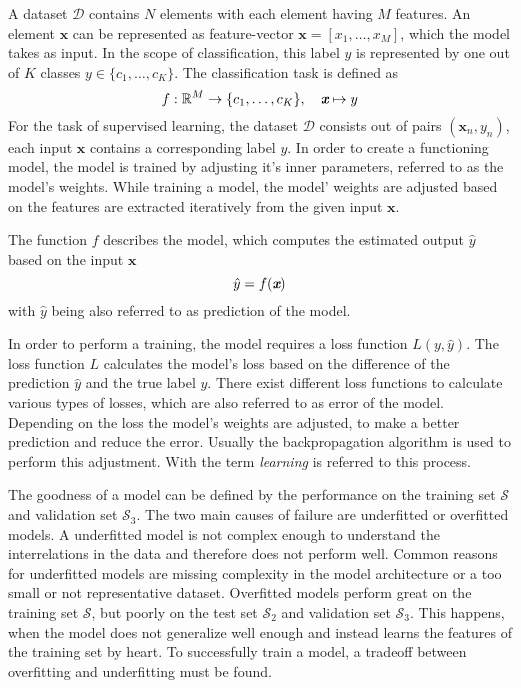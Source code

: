 A dataset $\mathcal{D}$ contains $N$ elements with each element having $M$ features.
An element $\textbf{x}$ can be represented as feature-vector $\textbf{x} = [x_1, \dots ,x_M]$, which the model takes as input.
In the scope of classification, this label $y$ is represented by one out of $K$ classes $y \in \lbrace c_1, \dots, c_K \rbrace$.
The classification task is defined as  
\begin{equation}
	f: \mathbb{R}^M \rightarrow \lbrace c_1,\ldots,c_K \rbrace, \quad \textit{\textbf{x}} \mapsto y
\end{equation}
For the task of supervised learning, the dataset $\mathcal{D}$ consists out of pairs $(\textbf{x}_n, y_n)$, each input $\textbf{x}$ contains a corresponding label $y$.
In order to create a functioning model, the model is trained by adjusting it's inner parameters, referred to as the model's weights.
While training a model, the model' weights are adjusted based on the features are extracted iteratively from the given input $\textbf{x}$.

The function $f$ describes the model, which computes the estimated output $\hat{y}$ based on the input $\textbf{x}$
\begin{equation}
	\hat y = f(\textit{\textbf{x}})
\end{equation}
with $\hat{y}$ being also referred to as prediction of the model.

In order to perform a training, the model requires a loss function $L(y,\hat{y})$.
The loss function $L$ calculates the model's loss based on the difference of the prediction $\hat{y}$ and the true label $y$.
There exist different loss functions to calculate various types of losses, which are also referred to as error of the model.
Depending on the loss the model's weights are adjusted, to make a better prediction and reduce the error.
Usually the backpropagation algorithm is used to perform this adjustment.
With the term \textit{learning} is referred to this process.

The goodness of a model can be defined by the performance on the training set $\mathcal{S}$ and validation set $\mathcal{S}_3$.
The two main causes of failure are underfitted or overfitted models.
A underfitted model is not complex enough to understand the interrelations in the data and therefore does not perform well.
Common reasons for underfitted models are missing complexity in the model architecture or a too small or not representative dataset.
Overfitted models perform great on the training set $\mathcal{S}$, but poorly on the test set $\mathcal{S}_2$ and validation set $\mathcal{S}_3$.
This happens, when the model does not generalize well enough and instead learns the features of the training set by heart.
To successfully train a model, a tradeoff between overfitting and underfitting must be found.

